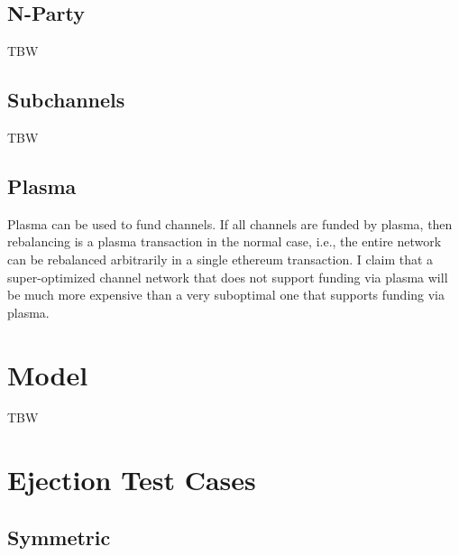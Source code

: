 \documentclass{article}
\begin{document}
\subsection*{N-Party}

TBW

\subsection*{Subchannels}

TBW

\subsection*{Plasma}

Plasma can be used to fund channels. If all channels are funded by plasma, then rebalancing is a plasma transaction in the normal case, i.e., the entire network can be rebalanced arbitrarily in a single ethereum transaction. I claim that a super-optimized channel network that does not support funding via plasma will be much more expensive than a very suboptimal one that supports funding via plasma.

\section*{Model}

TBW

\section*{Ejection Test Cases}

\subsection*{Symmetric}

\begin{figure}[H]
    \centering
\end{figure}
\end{document}

